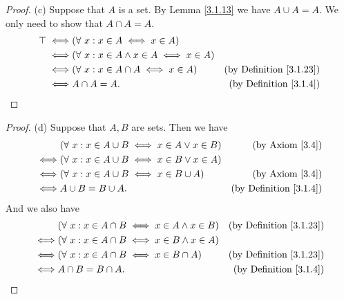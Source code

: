 \begin{proof}{(c)}
Suppose that \(A\) is a set.
By Lemma \ref{3.1.13} we have \(A \cup A = A\).
We only need to show that \(A \cap A = A\).
\begin{align*}
\top \iff & (\forall\ x : x \in A \iff x \in A) \\
\iff & (\forall\ x : x \in A \land x \in A \iff x \in A) \\
\iff & (\forall\ x : x \in A \cap A \iff x \in A) & \text{(by Definition \ref{3.1.23})} \\
\iff & A \cap A = A. & \text{(by Definition \ref{3.1.4})}
\end{align*}
\end{proof}

\begin{proof}{(d)}
Suppose that \(A, B\) are sets.
Then we have
\begin{align*}
& (\forall\ x : x \in A \cup B \iff x \in A \lor x \in B) & \text{(by Axiom \ref{3.4})} \\
\iff & (\forall\ x : x \in A \cup B \iff x \in B \lor x \in A) \\
\iff & (\forall\ x : x \in A \cup B \iff x \in B \cup A) & \text{(by Axiom \ref{3.4})} \\
\iff & A \cup B = B \cup A. & \text{(by Definition \ref{3.1.4})}
\end{align*}
And we also have
\begin{align*}
& (\forall\ x : x \in A \cap B \iff x \in A \land x \in B) & \text{(by Definition \ref{3.1.23})} \\
\iff & (\forall\ x : x \in A \cap B \iff x \in B \land x \in A) \\
\iff & (\forall\ x : x \in A \cap B \iff x \in B \cap A) & \text{(by Definition \ref{3.1.23})} \\
\iff & A \cap B = B \cap A. & \text{(by Definition \ref{3.1.4})}
\end{align*}
\end{proof}

